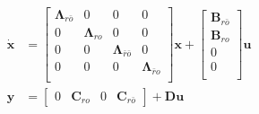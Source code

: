 \newpar{}
\begin{align*}
    \dot{\mathbf{x}} & = \begin{bmatrix}
                             \bm{\Lambda}_{r\bar{o}} & 0                 & 0                             & 0                       \\
                             0                       & \bm{\Lambda}_{ro} & 0                             & 0                       \\
                             0                       & 0                 & \bm{\Lambda}_{\bar{r}\bar{o}} & 0                       \\
                             0                       & 0                 & 0                             & \bm{\Lambda}_{\bar{r}o} \\
                         \end{bmatrix}
    \mathbf{x} + \begin{bmatrix}
                     \mathbf{B}_{r\bar{o}} \\
                     \mathbf{B}_{ro}       \\
                     0                     \\
                     0                     \\
                 \end{bmatrix}
    \mathbf{u}                                                                                                                 \\
    \mathbf{y}       & = \begin{bmatrix}
                             0 & \mathbf{C}_{ro} & 0 & \mathbf{C}_{r\bar{o}}
                         \end{bmatrix}
    + \mathbf{Du}
\end{align*}

